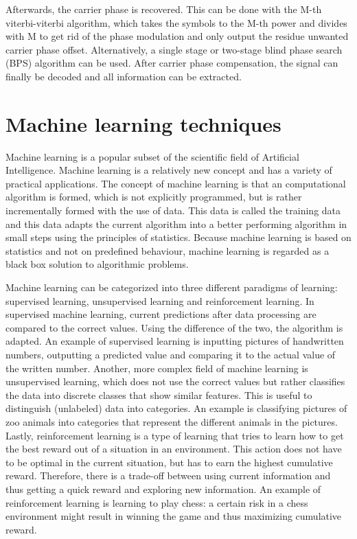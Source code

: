 \documentclass[journal,10pt,twoside, a4paper]{IEEEtran}
\begin{document}
Afterwards, the carrier phase is recovered. This can be done with the M-th viterbi-viterbi algorithm\cite{coherent_detection,viterbi}, which takes the symbols to the M-th power and divides with M to get rid of the phase modulation and only output the residue unwanted carrier phase offset. Alternatively, a single stage or two-stage blind phase search (BPS) algorithm can be used. After carrier phase compensation, the signal can finally be decoded and all information can be extracted.

\section{Machine learning techniques}
Machine learning is a popular subset of the scientific field of Artificial Intelligence. Machine learning is a relatively new concept and has a variety of practical applications. The concept of machine learning is that an computational algorithm is formed, which is not explicitly programmed, but is rather incrementally formed with the use of data. This data is called the training data and this data adapts the current algorithm into a better performing algorithm in small steps using the principles of statistics. Because machine learning is based on statistics and not on predefined behaviour, machine learning is regarded as a black box solution to algorithmic problems.

Machine learning can be categorized into three different paradigms of learning: supervised learning, unsupervised learning and reinforcement learning. In supervised machine learning, current predictions after data processing are compared to the correct values. Using the difference of the two, the algorithm is adapted. An example of supervised learning is inputting pictures of handwritten numbers, outputting a predicted value and comparing it to the actual value of the written number. Another, more complex field of machine learning is unsupervised learning, which does not use the correct values but rather classifies the data into discrete classes that show similar features. This is useful to distinguish (unlabeled) data into categories. An example is classifying pictures of zoo animals into categories that represent the different animals in the pictures. Lastly, reinforcement learning is a type of learning that tries to learn how to get the best reward out of a situation in an environment. This action does not have to be optimal in the current situation, but has to earn the highest cumulative reward. Therefore, there is a trade-off between using current information and thus getting a quick reward and exploring new information. An example of reinforcement learning is learning to play chess: a certain risk in a chess environment might result in winning the game and thus maximizing cumulative reward.
\end{document}
